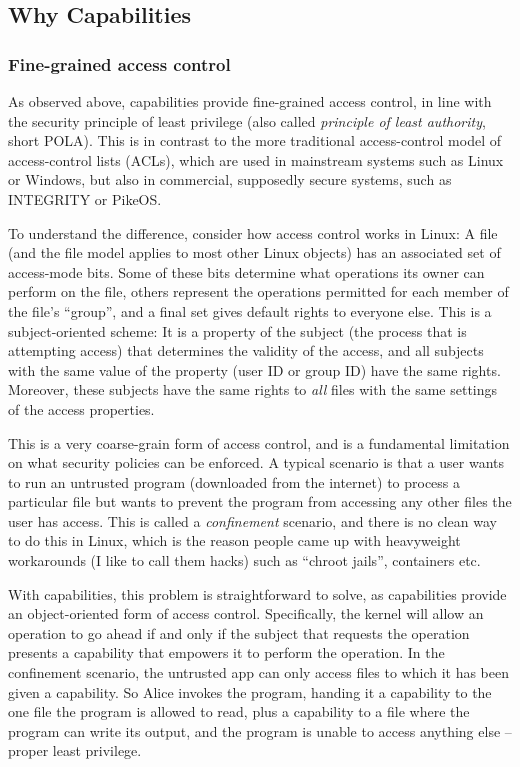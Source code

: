 \documentclass[english,a4paper,12pt]{report}
\newcommand{\SSect}[1]{\subsection{#1}}
\newcommand{\SSSect}[1]{\subsubsection*{#1}}
\newcommand{\SSect}[1]{\section{#1}}
\newcommand{\SSSect}[1]{\subsection*{#1}}
\begin{document}
  \SSect{Why Capabilities}

  \SSSect{Fine-grained access control}

  As observed above, capabilities provide fine-grained access control,
  in line with the security principle of least privilege (also called
  \emph{principle of least authority}, short POLA). This is in contrast to
  the more traditional access-control model of access-control lists
  (ACLs), which are used in mainstream systems such as Linux or
  Windows, but also in commercial, supposedly secure systems, such as
  INTEGRITY or PikeOS.

  To understand the difference, consider how access control works in
  Linux: A file (and the file model applies to most other Linux
  objects) has an associated set of access-mode bits. Some of these
  bits determine what operations its owner can perform on the file,
  others represent the operations permitted for each member of the file's
  ``group'', and a final set gives default rights to everyone
  else. This is a subject-oriented scheme: It is a property of the
  subject (the process that is attempting access) that determines the
  validity of the access, and all subjects with the same value of the
  property (user ID or group ID) have the same rights. Moreover, these
  subjects have the same rights to \emph{all} files with the same
  settings of the access properties.

  This is a very coarse-grain form of access control, and is a
  fundamental limitation on what security policies can be enforced. A
  typical scenario is that a user wants to run an untrusted program
  (downloaded from the internet) to process a particular file but
  wants to prevent the program from accessing any other files the user
  has access. This is called a \emph{confinement} scenario, and there
  is no clean way to do this in Linux, which is the reason people came
  up with heavyweight workarounds (I like to call them hacks) such as
  ``chroot jails'', containers etc.

  With capabilities, this problem is straightforward to solve, as
  capabilities provide an object-oriented form of access
  control. Specifically, the kernel will allow an operation to go
  ahead if and only if the subject that requests the operation
  presents a capability that empowers it to perform the operation. In the
  confinement scenario, the untrusted app can only access files to
  which it has been given a capability. So Alice invokes the
  program, handing it a capability to the one file the program is
  allowed to read, plus a capability to a file where the
  program can write its output, and the program is unable to access
  anything else -- proper least privilege.
\end{document}
